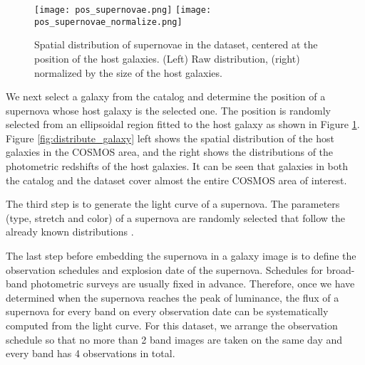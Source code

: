 \documentclass[conference,compsoc]{IEEEtran}
\begin{document}
\begin{figure}[t]
  \begin{center}
    \texttt{[image: pos\_supernovae.png]}\hspace{7pt}
    \texttt{[image: pos\_supernovae\_normalize.png]}
  \end{center}
  \caption{%
    Spatial distribution of supernovae in the dataset, centered at the position of the host galaxies.
    (Left) Raw distribution, (right) normalized by the size of the host galaxies.
  }
  \label{fig:pos_supernovae}
\end{figure}

  We next select a galaxy from the catalog and determine the position of a supernova whose host galaxy is the selected one.
  The position is randomly selected from an ellipsoidal region fitted to the host galaxy as shown in Figure \ref{fig:pos_supernovae}.
  Figure \ref{fig:distribute_galaxy} left shows the spatial distribution of the host galaxies in the COSMOS area, and the right shows the distributions of the photometric redshifts of the host galaxies.
  It can be seen that galaxies in both the catalog and the dataset cover almost the entire COSMOS area of interest.


  The third step is to generate the light curve of a supernova.
  The parameters (type, stretch and color) of a supernova are randomly selected that follow the already known distributions \cite{Mosher2014}. %

  The last step before embedding the supernova in a galaxy image is to define the observation schedules and explosion date of the supernova.
  Schedules for broad-band photometric surveys are usually fixed in advance.
  Therefore, once we have determined when the supernova reaches the peak of luminance, the flux of a supernova for every band on every observation date can be systematically computed from the light curve.
  For this dataset, we arrange the observation schedule so that no more than 2 band images are taken on the same day and every band has 4 observations in total.
\end{document}
